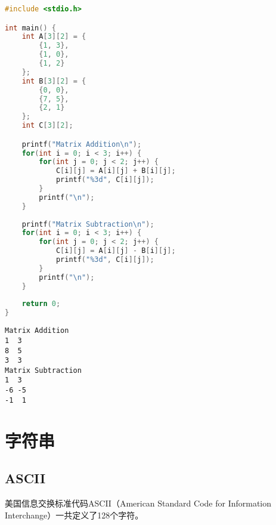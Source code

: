\begin{lstlisting}[language=C]
#include <stdio.h>

int main() {
	int A[3][2] = {
		{1, 3},
		{1, 0},
		{1, 2}
	};
	int B[3][2] = {
		{0, 0},
		{7, 5},
		{2, 1}
	};
	int C[3][2];

	printf("Matrix Addition\n");
	for(int i = 0; i < 3; i++) {
		for(int j = 0; j < 2; j++) {
			C[i][j] = A[i][j] + B[i][j];
			printf("%3d", C[i][j]);
		}
		printf("\n");
	}
	
	printf("Matrix Subtraction\n");
	for(int i = 0; i < 3; i++) {
		for(int j = 0; j < 2; j++) {
			C[i][j] = A[i][j] - B[i][j];
			printf("%3d", C[i][j]);
		}
		printf("\n");
	}
	
	return 0;
}
\end{lstlisting}

\begin{tcolorbox}
	\begin{verbatim}
Matrix Addition
1  3
8  5
3  3
Matrix Subtraction
1  3
-6 -5
-1  1
	\end{verbatim}
\end{tcolorbox}

\newpage

\section{字符串}

\subsection{ASCII}

美国信息交换标准代码ASCII（American Standard Code for Information Interchange）一共定义了128个字符。\\

